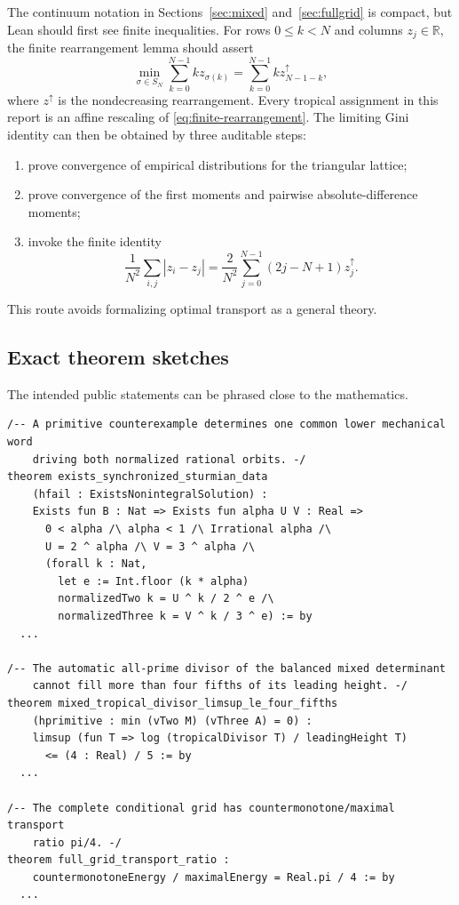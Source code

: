 \documentclass[11pt,oneside]{article}
\theoremstyle{definition}
\theoremstyle{remark}
\newcommand{\R}{\mathbb R}
\begin{document}
The continuum notation in Sections~\ref{sec:mixed} and~\ref{sec:fullgrid} is compact, but Lean
should first see finite inequalities.  For rows $0\le k<N$ and columns $z_j\in\R$, the finite
rearrangement lemma should assert
\begin{equation}\label{eq:finite-rearrangement}
  \min_{\sigma\in S_N}\sum_{k=0}^{N-1} k z_{\sigma(k)}
  =\sum_{k=0}^{N-1} k z_{N-1-k}^{\uparrow},
\end{equation}
where $z^{\uparrow}$ is the nondecreasing rearrangement.  Every tropical assignment in this
report is an affine rescaling of \eqref{eq:finite-rearrangement}.  The limiting Gini identity
can then be obtained by three auditable steps:
\begin{enumerate}
\item prove convergence of empirical distributions for the triangular lattice;
\item prove convergence of the first moments and pairwise absolute-difference moments;
\item invoke the finite identity
\[
 \frac1{N^2}\sum_{i,j}|z_i-z_j|
 =\frac2{N^2}\sum_{j=0}^{N-1}(2j-N+1)z_j^{\uparrow}.
\]
\end{enumerate}
This route avoids formalizing optimal transport as a general theory.

\subsection{Exact theorem sketches}

The intended public statements can be phrased close to the mathematics.

\begin{lstlisting}[style=leanstyle]
/-- A primitive counterexample determines one common lower mechanical word
    driving both normalized rational orbits. -/
theorem exists_synchronized_sturmian_data
    (hfail : ExistsNonintegralSolution) :
    Exists fun B : Nat => Exists fun alpha U V : Real =>
      0 < alpha /\ alpha < 1 /\ Irrational alpha /\
      U = 2 ^ alpha /\ V = 3 ^ alpha /\
      (forall k : Nat,
        let e := Int.floor (k * alpha)
        normalizedTwo k = U ^ k / 2 ^ e /\
        normalizedThree k = V ^ k / 3 ^ e) := by
  ...

/-- The automatic all-prime divisor of the balanced mixed determinant
    cannot fill more than four fifths of its leading height. -/
theorem mixed_tropical_divisor_limsup_le_four_fifths
    (hprimitive : min (vTwo M) (vThree A) = 0) :
    limsup (fun T => log (tropicalDivisor T) / leadingHeight T)
      <= (4 : Real) / 5 := by
  ...

/-- The complete conditional grid has countermonotone/maximal transport
    ratio pi/4. -/
theorem full_grid_transport_ratio :
    countermonotoneEnergy / maximalEnergy = Real.pi / 4 := by
  ...
\end{lstlisting}
\end{document}

